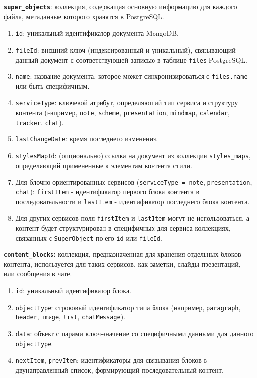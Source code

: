\textbf{\texttt{super\_objects}:} коллекция, содержащая основную информацию для каждого файла, метаданные которого хранятся в PostgreSQL.
    \begin{enumerate}[wide=12.5mm, leftmargin=12.5mm]
        \item \texttt{id}: уникальный идентификатор документа MongoDB.
        \item \texttt{fileId}: внешний ключ (индексированный и уникальный), связывающий данный документ с соответствующей записью в таблице \texttt{files} PostgreSQL.
        \item \texttt{name}: название документа, которое может синхронизироваться с \texttt{files.name} или быть специфичным.
        \item \texttt{serviceType}: ключевой атрибут, определяющий тип сервиса и структуру контента (например, \texttt{note}, \texttt{scheme}, \texttt{presentation}, \texttt{mindmap}, \texttt{calendar}, \texttt{tracker}, \texttt{chat}).
        \item \texttt{lastChangeDate}: время последнего изменения.
        \item \texttt{stylesMapId}: (опционально) ссылка на документ из коллекции \texttt{styles\_maps}, определяющий примененные к элементам контента стили.
        \item Для блочно-ориентированных сервисов (\texttt{serviceType = note}, \texttt{presentation}, \texttt{chat}): \texttt{firstItem} - идентификатор первого блока контента в последовательности и \texttt{lastItem} - идентификатор последнего блока контента.
        \item Для других сервисов поля \texttt{firstItem} и \texttt{lastItem} могут не использоваться, а контент будет структурирован в специфичных для сервиса коллекциях, связанных с \texttt{SuperObject} по его \texttt{id} или \texttt{fileId}.
    \end{enumerate}
\textbf{\texttt{content\_blocks}:} коллекция, предназначенная для хранения отдельных блоков контента, используется для таких сервисов, как заметки, слайды презентаций, или сообщения в чате.
    \begin{enumerate}[wide=12.5mm, leftmargin=12.5mm]
        \item \texttt{id}: уникальный идентификатор блока.
        \item \texttt{objectType}: строковый идентификатор типа блока (например, \texttt{paragraph}, \texttt{header}, \texttt{image}, \texttt{list}, \texttt{chatMessage}).
        \item \texttt{data}: объект с парами ключ-значение со специфичными данными для данного \texttt{objectType}.
        \item \texttt{nextItem}, \texttt{prevItem}: идентификаторы для связывания блоков в двунаправленный список, формирующий последовательный контент.
    \end{enumerate}

